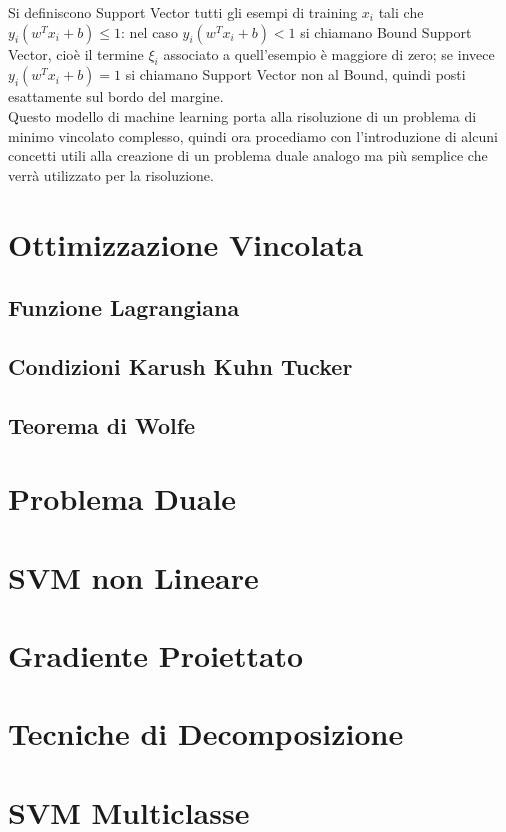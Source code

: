 \documentclass{report}
\begin{document}
Si definiscono Support Vector tutti gli esempi di training $x_i$ tali che $y_i(w^T x_i+b) \leqslant 1$: nel caso $y_i(w^T x_i+b) < 1$ si chiamano Bound Support Vector, cioè il termine $\xi_i$ associato a quell'esempio è maggiore di zero; se invece  $y_i(w^T x_i+b) = 1$ si chiamano Support Vector non al Bound, quindi posti esattamente sul bordo del margine.\\

Questo modello di machine learning porta alla risoluzione di un problema di minimo vincolato complesso, quindi ora procediamo con l'introduzione di alcuni concetti utili alla creazione di un problema duale analogo ma più semplice che verrà utilizzato per la risoluzione.

\section{Ottimizzazione Vincolata}



\subsection{Funzione Lagrangiana}



\subsection{Condizioni Karush Kuhn Tucker}



\subsection{Teorema di Wolfe}



\section{Problema Duale}



\section{SVM non Lineare}



\section{Gradiente Proiettato}



\section{Tecniche di Decomposizione}



\section{SVM Multiclasse}

 
\end{document}

